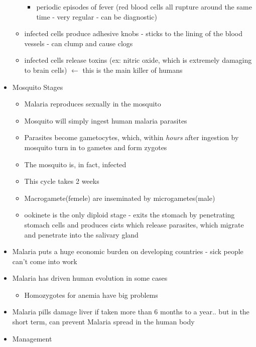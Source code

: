 \documentclass{article}
\begin{document}
\begin{itemize}
\begin{itemize}
            \begin{itemize}
                \item periodic episodes of fever (red blood cells all rupture around the same time - very regular - can be diagnostic)
            \end{itemize}
            \item infected cells produce adhesive knobs - sticks to the lining of the blood vessels - can clump and cause clogs
            \item infected cells release toxins (ex: nitric oxide, which is extremely damaging to brain cells) $\leftarrow$ this is the main killer of humans
        \end{itemize}
        \item Mosquito Stages
        \begin{itemize}
            \item Malaria reproduces sexually in the mosquito
            \item Mosquito will simply ingest human malaria parasites
            \item Parasites become gametocytes, which, within \emph{hours} after ingestion by mosquito turn in to gametes and form zygotes
            \item The mosquito is, in fact, infected
            \item This cycle takes 2 weeks
            \item Macrogamete(femele) are inseminated by microgametes(male)
            \item ookinete is the only diploid stage - exits the stomach by penetrating stomach cells and produces cists which release parasites, which migrate and penetrate into the salivary gland
        \end{itemize}
        \item Malaria puts a huge economic burden on developing countries - sick people can't come into work
        \item Malaria has driven human evolution in some cases
        \begin{itemize}
            \item Homozygotes for anemia have big problems
        \end{itemize}
        \item Malaria pills damage liver if taken more than 6 months to a year.. but in the short term, can prevent Malaria spread in the human body
        \item Management
        \begin{itemize}

\end{itemize}
\end{itemize}
\end{document}

